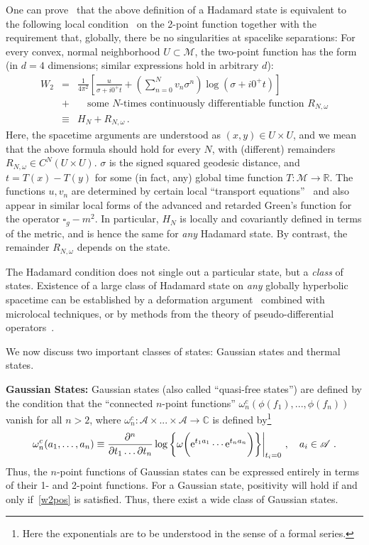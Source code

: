 \documentclass[12pt]{article}
\newcommand{\RR}{\mathbb{R}}
\newcommand{\CC}{\mathbb{C}}
\newcommand{\eA}{\mathscr{A}}
\newcommand{\M}{\mathscr{M}}
\newcommand{\e}{{\rm e}}
\theoremstyle{plain}
\theoremstyle{definition}
\def\ben{\begin{equation}}
\def\een{\end{equation}}
\def\bena{\begin{eqnarray}}
\def\eena{\end{eqnarray}}
\begin{document}
One can prove~\cite{rad1,rad2}
that the above definition of a Hadamard state
is equivalent to the following local condition~\cite{kaywald} on the 2-point function together with the requirement that, globally, there be no singularities at spacelike separations:
For every convex,
normal neighborhood $U \subset \M$, the two-point function has the form
(in $d=4$ dimensions; similar expressions hold in arbitrary $d$):
\bena\label{localhada}
W_2 &=& \frac{1}{4\pi^2} \left[
\frac{u}{\sigma + i0^+ t} + \left( \sum_{n=0}^N v_n
  \sigma^n \right) \log(\sigma
+ i0^+ t)
\right] \nonumber \\
&+& \quad \text{some $N$-times continuously differentiable function $R_{N,\omega}$}\\
&\equiv& H_N + R_{N,\omega} \, . \nonumber
\eena
Here, the spacetime arguments are understood as $(x,y) \in U
\times U$, and we mean that the above formula should
hold for every $N$,
with (different) remainders $R_{N,\omega} \in C^{N}(U \times U)$.
$\sigma$ is the signed squared geodesic distance, and $t=T(x)-T(y)$
for some (in fact, any) global time function $T: \M \to \RR$.
The functions $u, v_n$ are determined by certain local ``transport equations''~\cite{dewitt} and
also appear in similar local forms of the advanced
and retarded Green's function for the operator $\square_g
-m^2$. In particular, $H_N$
is locally and covariantly defined in terms of the metric, and
is hence the same for {\it any} Hadamard state. By contrast,
the remainder $R_{N,\omega}$ depends on the state.

The Hadamard condition does not single out a particular state, but a {\em class} of states.
Existence of
a large class of Hadamard state on {\em any} globally hyperbolic spacetime
can be established by a deformation
argument~\cite{fulling} combined with microlocal techniques, or by methods from
the theory of pseudo-differential operators~\cite{junker,gerard}.



We now discuss two important classes of states: Gaussian states and thermal states.

\vspace{.5cm}
%
{\bf Gaussian States:} Gaussian states (also called ``quasi-free states'')
are defined by the condition that the ``connected $n$-point functions''
$\omega^c_n(\phi(f_1),...,\phi(f_n))$ vanish for all $n > 2$, where
$\omega^c_n: \eA \times ... \times \eA \to \CC$ is defined by\footnote{
Here the exponentials are to be understood in the
sense of a formal series.}
\ben
\omega^c_n(a_1,\dots,a_n) \equiv \frac{\partial^n}{\partial t_1 \dots \partial t_n} \log \bigg\{ \omega\bigg(
\e^{t_1 a_1} \cdots \e^{t_n a_n} \bigg) \bigg\} \bigg|_{t_i=0} \ , \quad a_i \in \eA \ .
\label{cnpf}
\een
 Thus, the $n$-point functions of Gaussian states can be expressed
entirely in terms of their 1- and 2-point functions. For a Gaussian state, positivity will hold if and only
if~\eqref{w2pos} is satisfied. Thus, there exist a wide class of Gaussian states.
\end{document}
